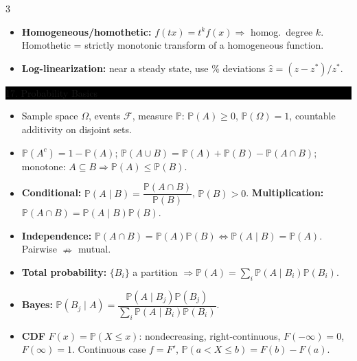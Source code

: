 \documentclass[8pt,letterpaper]{article}
\makeatletter
\newcommand{\sect}[1]{%
  \vspace{2.2pt}%
  \noindent\colorbox{black}{\parbox{\dimexpr\linewidth-2\fboxsep}{%
    \color{white}\bfseries\scshape\fontsize{6.4}{7.4}\selectfont
    \hyphenpenalty=10000\exhyphenpenalty=10000\raggedright #1}}%
  \vspace{1.4pt}\par\nopagebreak\@afterheading}
\newenvironment{tl}
  {\begin{itemize}[leftmargin=6pt,itemsep=0.3pt,topsep=1pt,parsep=0pt,
                   partopsep=0pt,label=\textcolor{gray}{\tiny$\bullet$}]}
  {\end{itemize}}
\newcommand{\PP}{\mathbb{P}}
\makeatother
\begin{document}
\begin{multicols}{3}
\begin{tl}
\item \textbf{Homogeneous/homothetic:} $f(tx)=t^kf(x)\Rightarrow$ homog.\ degree $k$. Homothetic = strictly monotonic transform of a homogeneous function.
\item \textbf{Log-linearization:} near a steady state, use \% deviations $\hat z=(z-z^*)/z^*$.
\end{tl}

\sect{17. Probability Basics}
\begin{tl}
\item Sample space $\Omega$, events $\mathcal F$, measure $\PP$: $\PP(A)\ge0$, $\PP(\Omega)=1$, countable additivity on disjoint sets.
\item $\PP(A^c)=1-\PP(A)$; $\PP(A\cup B)=\PP(A)+\PP(B)-\PP(A\cap B)$; monotone: $A\subseteq B\Rightarrow\PP(A)\le\PP(B)$.
\item \textbf{Conditional:} $\PP(A\mid B)=\dfrac{\PP(A\cap B)}{\PP(B)}$, $\PP(B)>0$. \textbf{Multiplication:} $\PP(A\cap B)=\PP(A\mid B)\PP(B)$.
\item \textbf{Independence:} $\PP(A\cap B)=\PP(A)\PP(B)\iff\PP(A\mid B)=\PP(A)$. Pairwise $\nRightarrow$ mutual.
\item \textbf{Total probability:} $\{B_i\}$ a partition $\Rightarrow\PP(A)=\sum_i\PP(A\mid B_i)\PP(B_i)$.
\item \textbf{Bayes:} $\PP(B_j\mid A)=\dfrac{\PP(A\mid B_j)\PP(B_j)}{\sum_i\PP(A\mid B_i)\PP(B_i)}$.
\item \textbf{CDF} $F(x)=\PP(X\le x)$: nondecreasing, right-continuous, $F(-\infty)=0$, $F(\infty)=1$. Continuous case $f=F'$, $\PP(a<X\le b)=F(b)-F(a)$.
\end{tl}


\end{multicols}
\end{document}
